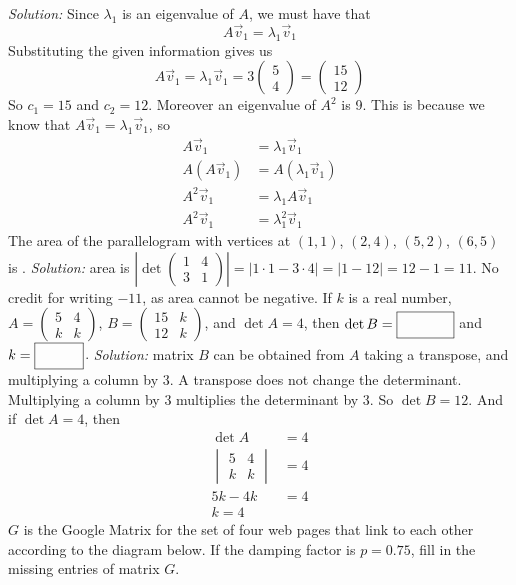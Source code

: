     \ifnum {} {\color{DarkBlue} \textit{Solution:} Since $\lambda_1$ is an eigenvalue of $A$, we must have that $$A\vec v_1 = \lambda_1 \vec v_1$$ Substituting the given information gives us $$A\vec v_1 = \lambda_1 \vec v_1 = 3 \begin{pmatrix} 5\\4 \end{pmatrix} = \begin{pmatrix} 15 \\ 12\end{pmatrix}$$  So $c_1 = 15$ and $c_2 = 12$. Moreover an eigenvalue of $A^2$ is 9. This is because we know that $A\vec v_1 = \lambda_1 \vec v_1$, so \begin{align}
        A\vec v_1 &= \lambda_1 \vec v_1 \\
        A(A\vec v_1) &= A(\lambda_1 \vec v_1) \\
        A^2\vec v_1 &= \lambda_1 A\vec v_1 \\
        A^2\vec v_1 &= \lambda_1^2 \vec v_1 
    \end{align}  } \fi    
\fi 
\ifnum {}
    The area of the parallelogram with vertices at $(1,1)$, $(2,4)$, $(5,2)$, $(6,5)$ is \framebox{\strut\hspace{1cm}}. 
    \ifnum {} {\color{DarkBlue} \textit{Solution:} area is $\left| \det \begin{pmatrix} 1&4\\3&1\end{pmatrix} \right| = \left| 1\cdot1 - 3\cdot4 \right| = | 1 - 12 | = 12 - 1 = 11$. No credit for writing $-11$, as area cannot be negative. } \fi  
\fi 
\ifnum {}
    If  $k$ is a  real number,  $A = \begin{pmatrix} 5&4\\k&k\end{pmatrix}$, $ B = \begin{pmatrix}15& k\\12 & k  \end{pmatrix}$, and $ \det A = 4$, then $\det B =  \framebox{\strut\hspace{1.2cm}}$ and $k= \framebox{\strut\hspace{1cm}}$.
    \ifnum {} {\color{DarkBlue} \textit{Solution:} matrix $B$ can be obtained from $A$ taking a transpose,  and multiplying a column by $3$. A transpose does not change the determinant.  Multiplying a column by $3$ multiplies the determinant by $3$. So $\det B = 12$. And if $\det A =4$, then \begin{align}
        \det A & = 4 \\
        \begin{vmatrix}
            5&4\\k&k 
        \end{vmatrix} &= 4 \\
        5k - 4k &= 4 \\
        k = 4
    \end{align}} \fi 
\fi 
\ifnum {}
    $G$ is the Google Matrix for the set of four web pages that link to each other according to the diagram below. If the damping factor is $p=0.75$, fill in the missing entries of matrix $G$. 
    \vspace{4pt}
    
